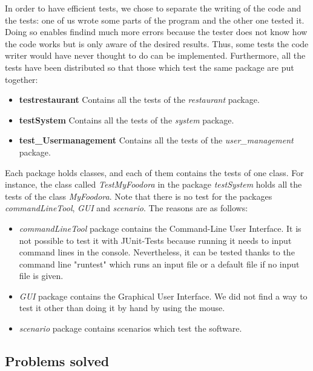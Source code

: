 In order to have efficient tests, we chose to separate the writing of the code and the tests: one of us wrote some parts of the program and the other one tested it. Doing so enables findind much more errors because the tester does not know how the code works but is only aware of the desired results. Thus, some tests the code writer would have never thought to do can be implemented.
Furthermore, all the tests have been distributed so that those which test the same package are put together:
\begin{itemize}
	\item{\textbf{testrestaurant}} Contains all the tests of the \textit{restaurant} package.
	\item{\textbf{testSystem}} Contains all the tests of the  \textit{system} package.
	\item{\textbf{test\_Usermanagement}} Contains all the tests of the \textit{user\_management} package.
\end{itemize}
Each package holds classes, and each of them contains the tests of one class. For instance, the class called \textit{TestMyFoodora} in the package \textit{testSystem} holds all the tests of the class \textit{MyFoodora}.  
Note that there is no test for the packages \textit{commandLineTool}, \textit{GUI} and \textit{scenario}. The reasons are as follows:
\begin{itemize}
	\item{\textit{commandLineTool}} package contains the Command-Line User Interface. It is not possible to test it with JUnit-Tests because running it needs to input command lines in the console. Nevertheless, it can be tested thanks to the command line "runtest" which runs an input file or a default file if no input file is given.
	\item{\textit{GUI}} package contains the Graphical User Interface. We did not find a way to test it other than doing it by hand by using the mouse.
	\item{\textit{scenario}} package contains scenarios which test the software.
\end{itemize}

\subsection{Problems solved}
\label{sub:problems_solved}

